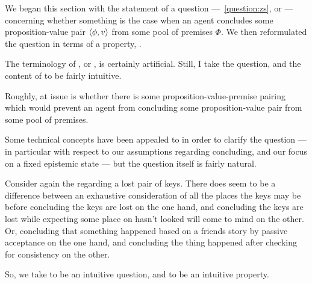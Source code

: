 \begin{note}
  We began this section with the statement of a question ---~\autoref{question:zs}, or \qzs{}  --- concerning whether something is the case when an agent concludes some proposition-value pair \(\langle \phi, v \rangle\) from some pool of premises \(\Phi\).
  We then reformulated the question in terms of a property, \zs{}.

  The terminology of \zs{}, or , is certainly artificial.
  Still, I take the question, and the content of \zs{} to be fairly intuitive.

  Roughly, at issue is whether there is some proposition-value-premise pairing which would prevent an agent from concluding some proposition-value pair from some pool of premises.

  Some technical concepts have been appealed to in order to clarify the question --- in particular with respect to our assumptions regarding concluding, and our focus on a fixed epistemic state --- but the question itself is fairly natural.

  Consider again the  regarding a lost pair of keys.
  There does seem to be a difference between an exhaustive consideration of all the places the keys may be before concluding the keys are lost on the one hand, and concluding the keys are lost while expecting some place on hasn't looked will come to mind on the other.
  Or, concluding that something happened based on a friends story by passive acceptance on the one hand, and concluding the thing happened after checking for consistency on the other.

  So, we take \qzs{} to be an intuitive question, and \zs{} to be an intuitive property.
\end{note}

